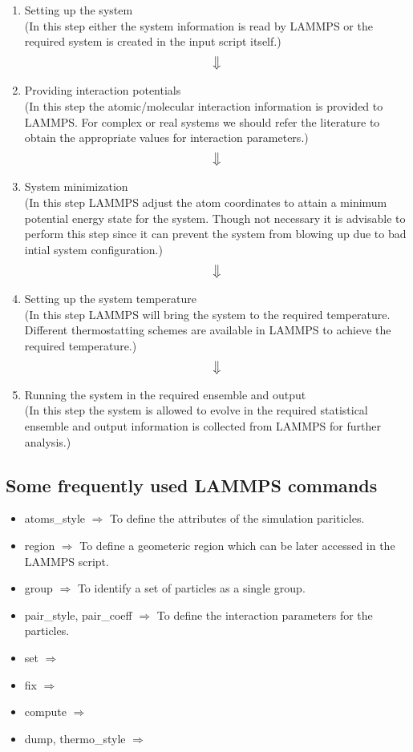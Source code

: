 \documentclass[12pt]{article}
\begin{document}
\begin{enumerate}
\centering
\item Setting up the system\\
(In this step either the system information is read by LAMMPS or 
the required system is created in the input script itself.)
$$\big\Downarrow$$
\item Providing interaction potentials \\
(In this step the atomic/molecular interaction information is provided to LAMMPS.
For complex or real systems we should refer the literature to obtain the 
appropriate values for interaction parameters.) \\
$$\big\Downarrow$$ 
\item System minimization \\
(In this step LAMMPS adjust the atom coordinates to attain a minimum potential energy state for 
the system. Though not necessary it is advisable to perform this step since it can prevent the 
system from blowing up due to bad intial system configuration.) \\
$$\big\Downarrow$$
\item Setting up the system temperature \\
(In this step LAMMPS will bring the system to the required temperature.
Different thermostatting schemes are available in LAMMPS to achieve the required temperature.) \\
$$\big\Downarrow$$
\item Running the system in the required ensemble and output \\
(In this step the system is allowed to evolve in the required statistical ensemble and 
output information is collected from LAMMPS for further analysis.)

\end{enumerate}

\newpage
\subsection{Some frequently used LAMMPS commands}
\begin{itemize}
\item atoms\_style $\Rightarrow$ To define the attributes of the simulation pariticles.
\item region $\Rightarrow$ To define a geometeric region which can be later accessed 
in the LAMMPS script.
\item group $\Rightarrow$ To identify a set of particles as a single group.
\item pair\_style, pair\_coeff $\Rightarrow$ To define the interaction parameters for the particles.
\item set $\Rightarrow$
\item fix $\Rightarrow$
\item compute $\Rightarrow$
\item dump, thermo\_style $\Rightarrow$
\end{itemize}
\end{document}
